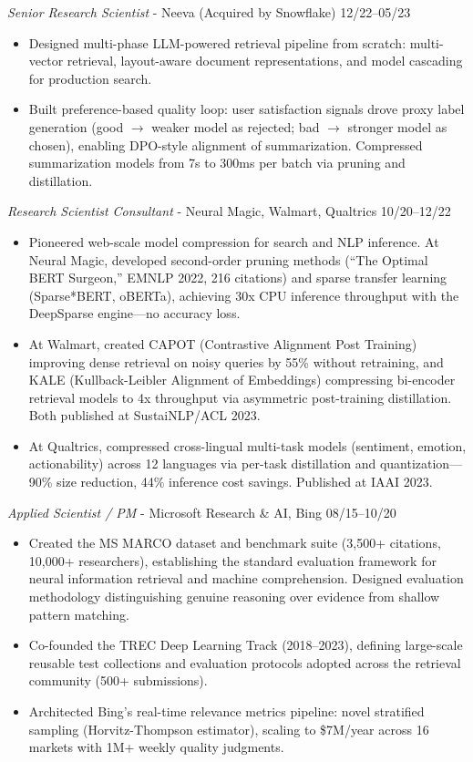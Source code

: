 \documentclass[line,margin]{res}
\begin{document}
\begin{resume}
\begin{itemize}
\end{itemize}
{\sl Senior Research Scientist} - Neeva (Acquired by Snowflake) \hfill 12/22--05/23
\begin{itemize} \itemsep -4pt
\item Designed multi-phase LLM-powered retrieval pipeline from scratch: multi-vector retrieval, layout-aware document representations, and model cascading for production search.
\item Built preference-based quality loop: user satisfaction signals drove proxy label generation (good $\rightarrow$ weaker model as rejected; bad $\rightarrow$ stronger model as chosen), enabling DPO-style alignment of summarization. Compressed summarization models from 7s to 300ms per batch via pruning and distillation.
\end{itemize}
{\sl Research Scientist Consultant} - Neural Magic, Walmart, Qualtrics \hfill 10/20--12/22
\begin{itemize} \itemsep -4pt
\item Pioneered web-scale model compression for search and NLP inference. At Neural Magic, developed second-order pruning methods (``The Optimal BERT Surgeon,'' EMNLP 2022, 216 citations) and sparse transfer learning (Sparse*BERT, oBERTa), achieving 30x CPU inference throughput with the DeepSparse engine---no accuracy loss.
\item At Walmart, created CAPOT (Contrastive Alignment Post Training) improving dense retrieval on noisy queries by 55\% without retraining, and KALE (Kullback-Leibler Alignment of Embeddings) compressing bi-encoder retrieval models to 4x throughput via asymmetric post-training distillation. Both published at SustaiNLP/ACL 2023.
\item At Qualtrics, compressed cross-lingual multi-task models (sentiment, emotion, actionability) across 12 languages via per-task distillation and quantization---90\% size reduction, 44\% inference cost savings. Published at IAAI 2023.
\end{itemize}
{\sl Applied Scientist / PM} - Microsoft Research \& AI, Bing \hfill 08/15--10/20
\begin{itemize} \itemsep -4pt
\item Created the MS MARCO dataset and benchmark suite (3,500+ citations, 10,000+ researchers), establishing the standard evaluation framework for neural information retrieval and machine comprehension. Designed evaluation methodology distinguishing genuine reasoning over evidence from shallow pattern matching.
\item Co-founded the TREC Deep Learning Track (2018--2023), defining large-scale reusable test collections and evaluation protocols adopted across the retrieval community (500+ submissions).
\item Architected Bing's real-time relevance metrics pipeline: novel stratified sampling (Horvitz-Thompson estimator), scaling to \$7M/year across 16 markets with 1M+ weekly quality judgments.
\end{itemize}

\end{resume}
\end{document}
